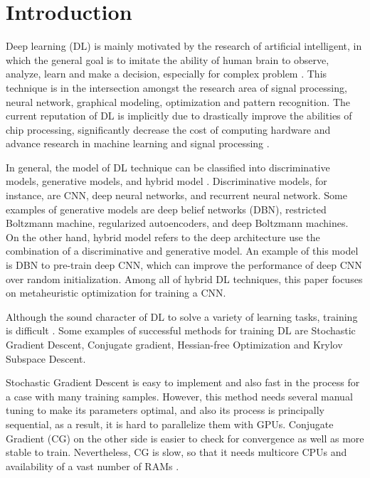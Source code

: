\documentclass[10pt,letterpaper]{article}
\begin{document}
\noindent{}


\section*{Introduction}
\label{Introduction}

Deep learning (DL) is mainly motivated by the research of artificial intelligent, in which the general goal is to imitate the ability of human brain to observe, analyze, learn and make a decision, especially for complex problem \cite{Naja}. This technique is in the intersection amongst the research area of signal processing, neural network, graphical modeling, optimization and pattern recognition. The current reputation of DL is implicitly due to drastically improve the abilities of chip processing, significantly decrease the cost of computing hardware and advance research in machine learning and signal processing \cite{Deng}.

In general, the model of DL technique can be classified into discriminative models, generative models, and hybrid model \cite{Deng}. Discriminative models, for instance, are CNN, deep neural networks, and recurrent neural network. Some examples of generative models are deep belief networks (DBN), restricted Boltzmann machine, regularized autoencoders, and deep Boltzmann machines. On the other hand, hybrid model refers to the deep architecture use the combination of a discriminative and generative model. An example of this model is DBN to pre-train deep CNN, which can improve the performance of deep CNN over random initialization. Among all of hybrid DL techniques, this paper focuses on metaheuristic optimization for training a CNN. 

Although the sound character of DL to solve a variety of learning tasks, training is difficult\cite{Lamos} \cite{Glauner} \cite{Rasdi}. Some examples of successful methods for training DL are Stochastic Gradient Descent, Conjugate gradient, Hessian-free Optimization and Krylov Subspace Descent.

Stochastic Gradient Descent is easy to implement and also fast in the process for a case with many training samples. However, this method needs several manual tuning to make its parameters optimal, and also its process is principally sequential, as a result, it is hard to parallelize them with GPUs. Conjugate Gradient (CG) on the other side is easier to check for convergence as well as more stable to train. Nevertheless, CG is slow, so that it needs multicore CPUs and availability of a vast number of RAMs \cite{QVLee}. 
\end{document}
